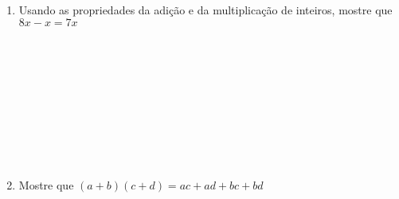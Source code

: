 \documentclass[a4paper,14pt]{article}
\begin{document}
\begin{multicols}{2}
\begin{enumerate}
\begin{enumerate}[a)]
    		\end{enumerate}
    		\item Usando as propriedades da adição e da multiplicação de inteiros, mostre que $8x - x = 7x$ \\\\\\\\\\\\\\\\\\\\
    		\item Mostre que $(a + b)(c + d) = ac + ad + bc + bd$ \\\\\\\\\\\\\\
    	\end{enumerate}
    $~$ \\ $~$ \\ $~$ \\ $~$ \\ $~$ \\ $~$ \\ $~$ \\ $~$ \\ $~$ \\ $~$
	\end{multicols}
\end{document}
